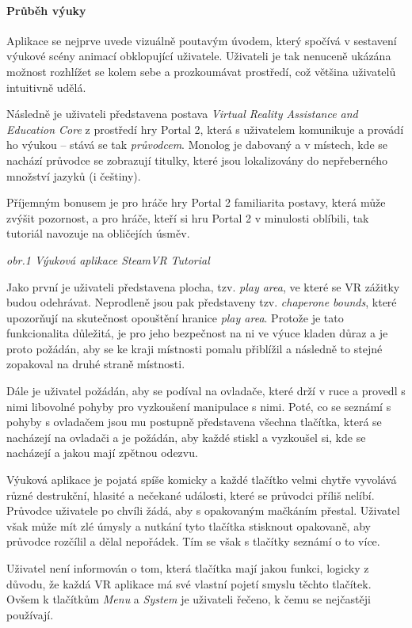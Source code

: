 \paragraph{Průběh výuky}\label{prux16fbux11bh-vuxfduky}

Aplikace se nejprve uvede vizuálně poutavým úvodem, který spočívá v
sestavení výukové scény animací obklopující uživatele. Uživateli je tak nenuceně
ukázána možnost rozhlížet se kolem sebe a prozkoumávat prostředí, což
většina uživatelů intuitivně udělá.

Následně je uživateli představena postava \emph{Virtual Reality
Assistance and Education Core} z prostředí hry Portal 2, která s uživatelem
komunikuje a provádí ho výukou -- stává se tak \emph{průvodcem}. Monolog
je dabovaný a v místech, kde se nachází průvodce se zobrazují titulky,
které jsou lokalizovány do nepřeberného množství jazyků (i češtiny).

Příjemným bonusem je pro hráče hry Portal 2 familiarita postavy, která
může zvýšit pozornost, a pro hráče, kteří si hru Portal 2 v
minulosti oblíbili, tak tutoriál navozuje na obličejích úsměv.


\emph{obr.1 Výuková aplikace SteamVR Tutorial}

Jako první je uživateli představena plocha, tzv. \emph{play area}, ve
které se VR zážitky budou odehrávat. Neprodleně jsou pak představeny
tzv. \emph{chaperone bounds}, které upozorňují na skutečnost opouštění 
hranice \emph{play area}. Protože je tato funkcionalita
důležitá, je pro jeho bezpečnost na ni ve výuce kladen důraz a je proto
požádán, aby se ke kraji místnosti pomalu přiblížil a následně to stejné
zopakoval na druhé straně místnosti.

Dále je uživatel požádán, aby se podíval na ovladače, které drží v ruce
a provedl s nimi libovolné pohyby pro vyzkoušení manipulace s nimi.
Poté, co se seznámí s pohyby s ovladačem jsou mu postupně představena
všechna tlačítka, která se nacházejí na ovladači a je požádán, aby každé
stiskl a vyzkoušel si, kde se nacházejí a jakou mají zpětnou odezvu.

Výuková aplikace je pojatá spíše komicky a každé tlačítko velmi chytře
vyvolává různé destrukční, hlasité a nečekané události, které se
průvodci příliš nelíbí. Průvodce uživatele po chvíli žádá, aby s opakovaným
mačkáním přestal. Uživatel však může mít zlé úmysly a nutkání tyto tlačítka
stisknout opakovaně, aby průvodce rozčílil a dělal nepořádek. Tím se
však s tlačítky seznámí o to více.

Uživatel není informován o tom, která tlačítka mají jakou funkci, logicky z
důvodu, že každá VR aplikace má své vlastní pojetí smyslu těchto
tlačítek. Ovšem k tlačítkům \emph{Menu} a \emph{System} je uživateli
řečeno, k čemu se nejčastěji používají.

